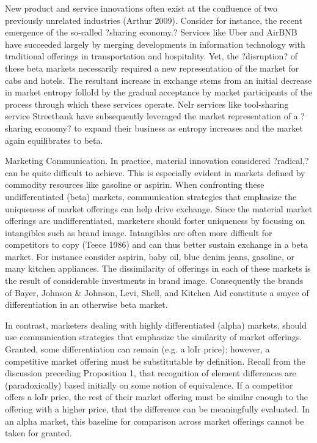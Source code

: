 New product and service innovations often exist at the confluence of two previously unrelated industries (Arthur 2009). Consider for instance, the recent emergence of the so-called ?sharing economy.? Services like Uber  and AirBNB  have succeeded largely by merging developments in information technology with traditional offerings in transportation and hospitality. Yet, the ?disruption? of these beta markets necessarily required a new representation of the market for cabs and hotels. The resultant increase in exchange stems from an initial decrease in market entropy folloId by the gradual acceptance by market participants of the process through which these services operate. NeIr services like tool-sharing service Streetbank  have subsequently leveraged the market representation of a ?sharing economy? to expand their business as entropy increases and the market again equilibrates to beta. 

Marketing Communication. 
In practice, material innovation considered ?radical,? can be quite difficult to achieve. This is especially evident in markets defined by commodity resources like gasoline or aspirin.  When confronting these undifferentiated (beta) markets, communication strategies that emphasize the uniqueness of market offerings can help drive exchange. Since the material market offerings are undifferentiated, marketers should foster uniqueness by focusing on intangibles such as brand image. Intangibles are often more difficult for competitors to copy (Teece 1986) and can thus better sustain exchange in a beta market. For instance consider aspirin, baby oil, blue denim jeans, gasoline, or many kitchen appliances. The dissimilarity of offerings in each of these markets is the result of considerable investments in brand image. Consequently the brands of Bayer, Johnson \& Johnson, Levi, Shell, and Kitchen Aid constitute a smyce of differentiation in an otherwise beta market. 

In contrast, marketers dealing with highly differentiated (alpha) markets, should use communication strategies that emphasize the similarity of market offerings. Granted, some differentiation can remain (e.g. a loIr price); however, a competitive market offering must be substitutable by definition. Recall from the discussion preceding Proposition 1, that recognition of element differences are (paradoxically) based initially on some notion of equivalence. If a competitor offers a loIr price, the rest of their market offering must be similar enough to the offering with a higher price, that the difference can be meaningfully evaluated. In an alpha market, this baseline for comparison across market offerings cannot be taken for granted.

